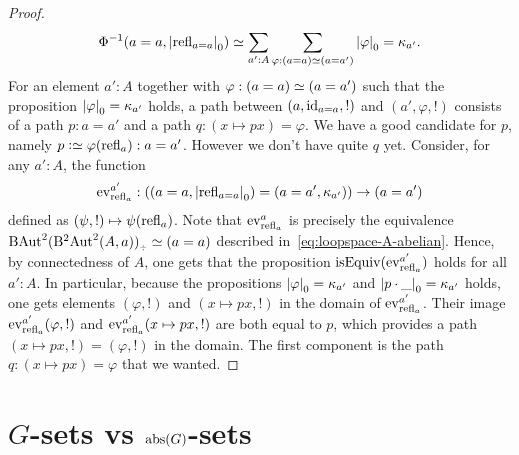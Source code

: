 \begin{proof}
\begin{displaymath}
    \Phi^{-1}(a=a,{\lvert\mathrm{refl}_{a=a}\rvert}_0) \simeq \sum_{a':A}
    \sum_{\varphi : (a=a) \simeq (a=a')}{\lvert\varphi\rvert}_0 = \kappa_{a'}.
  \end{displaymath}
  For an element $a':A$ together with $\varphi: (a=a) \simeq (a=a')$
  such that the proposition ${\lvert\varphi\rvert}_0 = \kappa_{a'}$ holds, a
  path between $(a,\mathord{\mathrm{id}}_{a=a},!)$ and $(a',\varphi,!)$ consists of a
  path $p:a=a'$ and a path $q:(x\mapsto p x) = \varphi$. We have a
  good candidate for $p$, namely $p\defequi \varphi(\refl
  a):a=a'$. However we don't have quite $q$ yet. Consider, for any
  $a':A$, the function
  \begin{displaymath}
    \ev_{\refl a}^{a'} :
    \left(
      (a=a, \settrunc{\refl{a=a}} ) =
      (a=a', \kappa_{a'} )
    \right)
    \to (a=a')
  \end{displaymath}
  defined as $(\psi,!) \mapsto \psi(\mathrm{refl}_{a})$.
  Note that $\ev_{\refl a}^{a}$ is precisely the equivalence
  $\B\loopspace{(\BB\loopspace(A,a))}_\div \weq (a=a)$ described
  in~\cref{eq:loopspace-A-abelian}. Hence, by connectedness of $A$,
  one gets that the proposition $\isEq(\ev_{\refl a}^{a'})$ holds for
  all $a':A$. In particular, because the propositions
  ${\lvert\varphi\rvert}_0 = \kappa_{a'}$ and
  ${\lvert p\cdot\_\rvert}_0 = \kappa_{a'}$ holds, one gets elements
  $(\varphi,!)$ and $(x\mapsto px,!)$ in the domain of
  $\ev_{\refl a}^{a'}$. Their image $\ev_{\refl a}^{a'}(\varphi,!)$
  and $\ev_{\refl a}^{a'}(x\mapsto px,!)$ are both equal to $p$, which
  provides a path $(x\mapsto px,!)=(\varphi,!)$ in the domain. The
  first component is the path $q:(x\mapsto px) = \varphi$ that we
  wanted.
\end{proof}


\section{$G$-sets vs $\mathrm{abs}(G)$-sets}
\label{sec:Gsetsabstrconcr}


